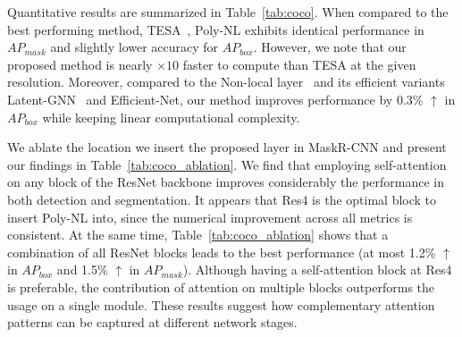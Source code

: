 \documentclass[10pt,twocolumn,letterpaper]{article}
\begin{document}
Quantitative results are summarized in Table~\ref{tab:coco}. When compared to the best performing method, TESA~\cite{babiloni2020tesa}, Poly-NL exhibits identical performance in $AP_{mask}$ and slightly lower accuracy for $AP_{box}$. However, we note that our proposed method is nearly $\times 10$ faster to compute than TESA at the given resolution. Moreover, compared to the Non-local layer~\cite{wang2018non} and its efficient variants Latent-GNN~\cite{zhang2019latentgnn} and Efficient-Net, our method improves performance by 0.3\% $\uparrow$  in $AP_{box}$ while keeping linear computational complexity.

We ablate the location we insert the proposed layer in MaskR-CNN and present our findings in Table~\ref{tab:coco_ablation}. We find that employing self-attention on any block of the ResNet backbone improves considerably the performance in both detection and segmentation. It appears that Res4 is the optimal block to insert Poly-NL into, since the numerical improvement across all metrics is consistent. At the same time, Table~\ref{tab:coco_ablation} shows that a combination of all ResNet blocks leads to the best performance (at most 1.2\% $\uparrow$  in $AP_{box}$  and 1.5\% $\uparrow$  in $AP_{mask}$). Although having a self-attention block at Res4 is preferable, the contribution of attention on multiple blocks outperforms the usage on a single module. These results suggest how complementary attention patterns can be captured at different network stages. 
\end{document}
